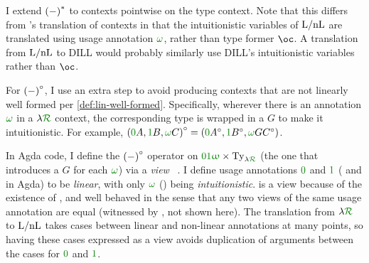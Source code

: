 I extend $\plr{-}^*$ to contexts pointwise on the type context.
Note that this differs from \citeauthor{Benton94}'s translation of contexts in
that the intuitionistic variables of $\mathrm{L/nL}$ are translated using usage
annotation $\gr\omega$, rather than type former $\oc$.
A translation from $\mathrm{L/nL}$ to DILL would probably similarly use DILL's
intuitionistic variables rather than $\oc$.

For $\plr{-}^\circ$, I use an extra step to avoid producing contexts
that are not linearly well formed per \cref{def:lin-well-formed}.
Specifically, wherever there is an annotation $\gr\omega$ in a $\name$ context,
the corresponding type is wrapped in a $G$ to make it intuitionistic.
For example, $\plr{\gr0A, \gr1B, \gr\omega C}^\circ =
\plr{\gr0A^\circ, \gr1B^\circ, \gr\omega GC^\circ}$.

In Agda code, I define the $\plr{-}^\circ$ operator on
$\oiw \times \mathrm{Ty}_{\name}$ (the one that introduces a $G$ for each
$\gr\omega$) via a \emph{view} ~\citep{MM04}.
I define usage annotations $\gr0$ and $\gr1$ ( and
 in Agda) to be \emph{linear}, with only
$\gr\omega$ () being
\emph{intuitionistic}.
 is a view because of the existence of
, and well behaved in the sense
that any two views of the same usage annotation are equal (witnessed by
, not shown here).
The translation from $\name$ to $\mathrm{L/nL}$ takes cases between linear and non-linear
annotations at many points, so having these cases expressed as a view avoids
duplication of arguments between the cases for $\gr0$ and $\gr1$.



